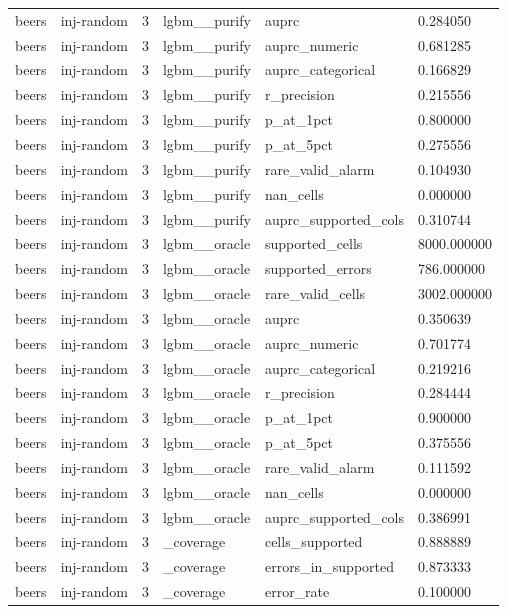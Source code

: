\begin{tabular}{llllll}
beers & inj-random & 3 & lgbm\_\_purify & auprc & 0.284050 \\
beers & inj-random & 3 & lgbm\_\_purify & auprc\_numeric & 0.681285 \\
beers & inj-random & 3 & lgbm\_\_purify & auprc\_categorical & 0.166829 \\
beers & inj-random & 3 & lgbm\_\_purify & r\_precision & 0.215556 \\
beers & inj-random & 3 & lgbm\_\_purify & p\_at\_1pct & 0.800000 \\
beers & inj-random & 3 & lgbm\_\_purify & p\_at\_5pct & 0.275556 \\
beers & inj-random & 3 & lgbm\_\_purify & rare\_valid\_alarm & 0.104930 \\
beers & inj-random & 3 & lgbm\_\_purify & nan\_cells & 0.000000 \\
beers & inj-random & 3 & lgbm\_\_purify & auprc\_supported\_cols & 0.310744 \\
beers & inj-random & 3 & lgbm\_\_oracle & supported\_cells & 8000.000000 \\
beers & inj-random & 3 & lgbm\_\_oracle & supported\_errors & 786.000000 \\
beers & inj-random & 3 & lgbm\_\_oracle & rare\_valid\_cells & 3002.000000 \\
beers & inj-random & 3 & lgbm\_\_oracle & auprc & 0.350639 \\
beers & inj-random & 3 & lgbm\_\_oracle & auprc\_numeric & 0.701774 \\
beers & inj-random & 3 & lgbm\_\_oracle & auprc\_categorical & 0.219216 \\
beers & inj-random & 3 & lgbm\_\_oracle & r\_precision & 0.284444 \\
beers & inj-random & 3 & lgbm\_\_oracle & p\_at\_1pct & 0.900000 \\
beers & inj-random & 3 & lgbm\_\_oracle & p\_at\_5pct & 0.375556 \\
beers & inj-random & 3 & lgbm\_\_oracle & rare\_valid\_alarm & 0.111592 \\
beers & inj-random & 3 & lgbm\_\_oracle & nan\_cells & 0.000000 \\
beers & inj-random & 3 & lgbm\_\_oracle & auprc\_supported\_cols & 0.386991 \\
beers & inj-random & 3 & \_coverage & cells\_supported & 0.888889 \\
beers & inj-random & 3 & \_coverage & errors\_in\_supported & 0.873333 \\
beers & inj-random & 3 & \_coverage & error\_rate & 0.100000 \\

\end{tabular}
